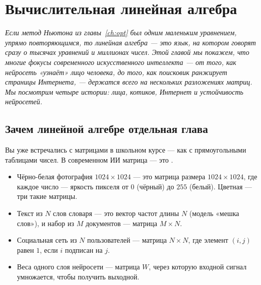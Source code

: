 %
%
%      
%

\chapter{Вычислительная линейная алгебра}
\label{ch:linalg}

\emph{Если метод Ньютона из главы~\ref{ch:opt} был одним
маленьким уравнением, упрямо повторяющимся, то линейная алгебра —
это язык, на котором говорят сразу о тысячах уравнений и миллионах
чисел. Этой главой мы покажем, что многие фокусы современного
искусственного интеллекта — от того, как нейросеть «узнаёт» лицо
человека, до того, как поисковик ранжирует страницы Интернета, —
держатся всего на нескольких разложениях матриц. Мы посмотрим
четыре истории: лица, котиков, Интернет и устойчивость нейросетей.}

\section{Зачем линейной алгебре отдельная глава}
\label{sec:linalg-why}

Вы уже встречались с матрицами в школьном курсе — как с прямоугольными
таблицами чисел. В современном ИИ матрица — это .

\begin{itemize}\itemsep1pt
  \item Чёрно-белая фотография $1024\times 1024$ — это матрица
        размера $1024\times 1024$, где каждое число — яркость пикселя
        от $0$ (чёрный) до $255$ (белый). Цветная — три такие матрицы.
  \item Текст из $N$ слов словаря — это вектор частот длины $N$
        (модель «мешка слов»), и набор из $M$ документов — матрица
        $M\times N$.
  \item Социальная сеть из $N$ пользователей — матрица $N\times N$,
        где элемент $(i,j)$ равен $1$, если $i$ подписан на $j$.
  \item Веса одного слоя нейросети — матрица $W$, через которую
        входной сигнал умножается, чтобы получить выходной.
\end{itemize}

